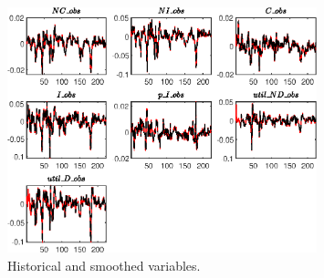  
\begin{figure}[H]
\centering 
\includegraphics[width=0.80\textwidth]{BRS_sectoral_wo_vcu/graphs/BRS_sectoral_wo_vcu_HistoricalAndSmoothedVariables1}
\caption{Historical and smoothed variables.}\label{Fig:HistoricalAndSmoothedVariables:1}
\end{figure}


